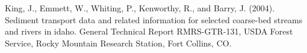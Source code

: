 \documentclass[11pt]{article}
\begin{document}
\begin{thebibliography}{3}
%
%
%
%
%
%
%
%
%
King, J., Emmett, W., Whiting, P., Kenworthy, R., and Barry, J. (2004).
\newblock Sediment transport data and related information for selected
  coarse-bed streams and rivers in idaho.
\newblock General Technical Report RMRS-GTR-131, USDA Forest Service, Rocky
  Mountain Research Station, Fort Collins, CO.
%
%


\end{thebibliography}
\end{document}
